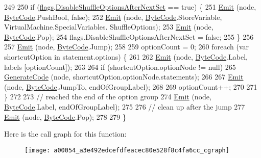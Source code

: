 \begin{DoxyCode}
249 
250             \textcolor{keywordflow}{if} (\hyperlink{a00054_a541022d89bcf9bc8f794eb6d6b438d08}{flags}.\hyperlink{a00054_a8b49bb7763ff477cba21d7c771ef3ed0}{DisableShuffleOptionsAfterNextSet} == \textcolor{keyword}{true}) \{
251                 \hyperlink{a00054_a774e8c143cdda0584fcfdda98626a83c}{Emit} (node, \hyperlink{a00051_ad5dfb6ee68ca7469623ad3e459f98894}{ByteCode}.PushBool, \textcolor{keyword}{false});
252                 \hyperlink{a00054_a774e8c143cdda0584fcfdda98626a83c}{Emit} (node, \hyperlink{a00051_ad5dfb6ee68ca7469623ad3e459f98894}{ByteCode}.StoreVariable, VirtualMachine.SpecialVariables.
      ShuffleOptions);
253                 \hyperlink{a00054_a774e8c143cdda0584fcfdda98626a83c}{Emit} (node, \hyperlink{a00051_ad5dfb6ee68ca7469623ad3e459f98894}{ByteCode}.Pop);
254                 flags.DisableShuffleOptionsAfterNextSet = \textcolor{keyword}{false};
255             \}
256 
257             \hyperlink{a00054_a774e8c143cdda0584fcfdda98626a83c}{Emit} (node, \hyperlink{a00051_ad5dfb6ee68ca7469623ad3e459f98894}{ByteCode}.Jump);
258 
259             optionCount = 0;
260             \textcolor{keywordflow}{foreach} (var shortcutOption \textcolor{keywordflow}{in} statement.options) \{
261 
262                 \hyperlink{a00054_a774e8c143cdda0584fcfdda98626a83c}{Emit} (node, \hyperlink{a00051_ad5dfb6ee68ca7469623ad3e459f98894}{ByteCode}.Label, labels [optionCount]);
263 
264                 \textcolor{keywordflow}{if} (shortcutOption.optionNode != null)
265                     \hyperlink{a00054_a006f3becd521cc179ba3d3352f6f930b}{GenerateCode} (node, shortcutOption.optionNode.statements);
266 
267                 \hyperlink{a00054_a774e8c143cdda0584fcfdda98626a83c}{Emit} (node, \hyperlink{a00051_ad5dfb6ee68ca7469623ad3e459f98894}{ByteCode}.JumpTo, endOfGroupLabel);
268 
269                 optionCount++;
270 
271             \}
272 
273             \textcolor{comment}{// reached the end of the option group}
274             \hyperlink{a00054_a774e8c143cdda0584fcfdda98626a83c}{Emit} (node, \hyperlink{a00051_ad5dfb6ee68ca7469623ad3e459f98894}{ByteCode}.Label, endOfGroupLabel);
275 
276             \textcolor{comment}{// clean up after the jump}
277             \hyperlink{a00054_a774e8c143cdda0584fcfdda98626a83c}{Emit} (node, \hyperlink{a00051_ad5dfb6ee68ca7469623ad3e459f98894}{ByteCode}.Pop);
278 
279         \}
\end{DoxyCode}


Here is the call graph for this function\-:
\nopagebreak
\begin{figure}[H]
\begin{center}
\leavevmode
\texttt{[image: a00054\_a3e492edcefdfeacec80e528f8c4fa6cc\_cgraph]}
\end{center}
\end{figure}


